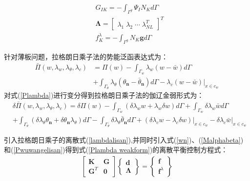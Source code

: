 \begin{equation}
\begin{split}
    &G_{IK}=-\int_{\Gamma^g}\Psi_IN_Kd\Gamma\\
    &\pmb{\Lambda}= \left[\begin{matrix}\lambda_1\;\lambda_2\;\dotsb\;\lambda_{N\!L}^T\end{matrix}\right]^T\\
    &f_K^{\lambda}=-\int_{\Gamma^g}N_K\pmb{g}d\Gamma
\end{split}
\end{equation}\par
针对薄板问题，拉格朗日乘子法的势能泛函表达式为：
\begin{equation}\label{Plambda}
\begin{split}
    \bar{\Pi}(w,\lambda_w,\lambda_{\theta},\lambda_c)&=\Pi(w)-\int_{\Gamma_w}\lambda_w(w-\bar{w})d\Gamma\\
    &+\int_{\Gamma_{\theta}}\lambda_{\theta}(\theta_{\pmb n}-\bar{\theta}_{\pmb n})d\Gamma-\lambda_c(w-\bar{w})\vert_{x\in c_w}
\end{split}
\end{equation}
对式(\ref{Plambda})进行变分得到拉格朗日乘子法的伽辽金弱形式为：
\begin{equation}\label{Plambda weakform}
\begin{split}
    &\delta\bar{\Pi}(w,\lambda_w,\lambda_{\theta},\lambda_c)=\delta\Pi(w)-\int_{\Gamma_w}(\delta\lambda_w w+\lambda_w\delta w)d\Gamma+\int_{\Gamma_w}\delta\lambda_w\bar{w}d\Gamma\\
&+\int_{\Gamma_{\theta}}(\delta\lambda_{\theta}\theta_{\pmb n}+\delta\theta_{\pmb n}\lambda_{\theta})d\Gamma-\int_{\Gamma_{\theta}}\delta\lambda_{\theta}\bar{\theta}_{\pmb n}d\Gamma
+(\delta\lambda_c w-\lambda_c\delta w)\vert_{x\in c_w}-\delta\lambda_c\bar{w}\vert_{x\in c_w}
\end{split}
\end{equation}\par
引入拉格朗日乘子的离散式(\ref{lambdalisan}),并同时引入式(\ref{wn})、(\ref{Malphabeta})和(\ref{Pwuwangelisan})得到式(\ref{Plambda weakform})的离散平衡控制方程式：
\begin{equation}
\begin{split}
        \left[\begin{matrix}\pmb{K}&\pmb{G}\\\pmb{G}^T&\pmb{0}\end{matrix}\right]
        \left\{\begin{matrix}\pmb{d}\\\pmb{\Lambda}\end{matrix}\right\}=
        \left\{\begin{matrix}\pmb{f}\\\pmb{f}^{\lambda}\end{matrix}\right\}
\end{split}
\end{equation}
